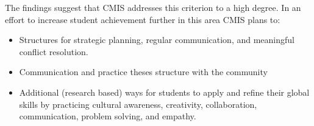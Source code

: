 
The findings suggest that CMIS addresses this criterion to a high degree. In an effort to increase student achievement further in this area CMIS plans to:

\begin{itemize}
\item Structures for strategic planning, regular communication, and meaningful conflict resolution. 
\item Communication and practice theses structure with the community
\end{itemize}


\begin{itemize}
\item Additional (research based) ways for students to apply and refine their global skills by practicing cultural awareness, creativity, collaboration, communication, problem solving, and empathy.
\end{itemize}

